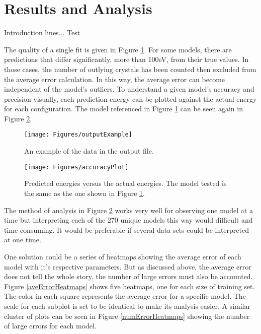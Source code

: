 \section{Results and Analysis}\label{Sect:results}
\par Introduction lines... Test
\par The quality of a single fit is given in Figure \ref{outputExample}. For some models, there are predictions that differ significantly, more than 100eV, from their true values. In those cases, the number of outlying crystals has been counted then excluded from the average error calculation. In this way, the average error can become independent of the model's outliers. To understand a given model's accuracy and precision visually, each prediction energy can be plotted against the actual energy for each configuration. The model referenced in Figure \ref{outputExample} can be seen again in Figure \ref{accuracyPlot}.

\begin{figure}[h]
\texttt{[image: Figures/outputExample]}
\caption{An example of the data in the output file. 
\label{outputExample}} 
\end{figure}

\begin{figure}[h]
\texttt{[image: Figures/accuracyPlot]}
\caption{Predicted energies versus the actual energies. The model tested is the same as the one shown in Figure \ref{outputExample}.
\label{accuracyPlot}} 
\end{figure}

\par The method of analysis in Figure \ref{accuracyPlot} works very well for observing one model at a time but interpreting each of the 270 unique models this way would difficult and time consuming. It would be preferable if several data sets could be interpreted at one time.
\par One solution could be a series of heatmaps showing the average error of each model with it's respective parameters. But as discussed above, the average error does not tell the whole story, the number of large errors must also be accounted. Figure \ref{aveErrorHeatmaps} shows five heatmaps, one for each size of training set. The color in each square represents the average error for a specific model. The scale for each subplot is set to be identical to make its analysis easier. A similar cluster of plots can be seen in Figure \ref{numErrorHeatmaps} showing the number of large errors for each model. 

